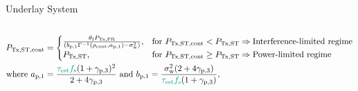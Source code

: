 \documentclass[16pt]{beamer}
\begin{document}
\begin{frame}[t]{Underlay System}
\begin{columns}
\begin{column}{0.55\columnwidth}
\begin{center}
{
                }
		\end{center}
		\end{column}
	\end{columns}
	\begin{block}{}%
		\vspace{-4mm}
		\begin{align*}
			\preg &= 
			\begin{cases} 
				\frac{\ite \ptran}{ \left(\bpo \Gamma^{-1}(\opc, \apo) - \nps  \right)}, & \mbox{for } \preg < \pc \Rightarrow \text{Interference-limited regime}\\
				\pc, & \mbox{for } \preg \ge \pc \Rightarrow \text{Power-limited regime}
				\end{cases} \\
				\text{where  } \apo &= \frac{{\color{kit-green100}{\test \fsam}} (1 + {\color{black}{\snrrcvdu}})^2}{2 + 4 {\color{black}{\snrrcvdu}}} \text{ and } \bpo = \frac{\nps (2 + 4 {\color{black}{\snrrcvdu}})}{{\color{kit-green100}{\test \fsam}} (1 + {\color{black}{\snrrcvdu}})},
			\end{align*}
	\end{block}
\end{frame}
\end{document}
